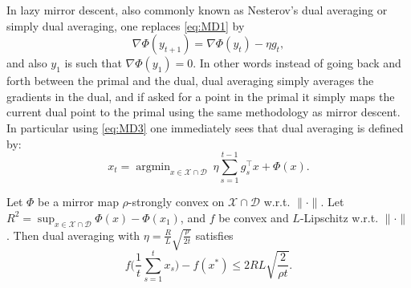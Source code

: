 \documentclass[openany]{now}
\newcommand{\argmin}{\mathop{\mathrm{argmin}}}
\begin{document}
In lazy mirror descent, also commonly known as Nesterov's dual averaging or simply dual averaging, one replaces \eqref{eq:MD1} by
$$\nabla \Phi(y_{t+1}) = \nabla \Phi(y_{t}) - \eta g_t ,$$
and also $y_1$ is such that $\nabla \Phi(y_1) = 0$. In other words instead of going back and forth between the primal and the dual, dual averaging simply averages the gradients in the dual, and if asked for a point in the primal it simply maps the current dual point to the primal using the same methodology as mirror descent. In particular using \eqref{eq:MD3} one immediately sees that dual averaging is defined by:
\begin{equation} \label{eq:DA0}
x_t = \argmin_{x \in \mathcal{X} \cap \mathcal{D}} \ \eta \sum_{s=1}^{t-1} g_s^{\top} x + \Phi(x) .
\end{equation}
\begin{theorem}
Let $\Phi$ be a mirror map $\rho$-strongly convex on $\mathcal{X} \cap \mathcal{D}$ w.r.t. $\|\cdot\|$.
Let $R^2 = \sup_{x \in \mathcal{X} \cap \mathcal{D}} \Phi(x) - \Phi(x_1)$, and $f$ be convex and $L$-Lipschitz w.r.t. $\|\cdot\|$. Then dual averaging with $\eta = \frac{R}{L} \sqrt{\frac{\rho}{2 t}}$ satisfies
$$f\bigg(\frac{1}{t} \sum_{s=1}^t x_s \bigg) - f(x^*) \leq 2 RL \sqrt{\frac{2}{\rho t}} .$$
\end{theorem}
\end{document}
